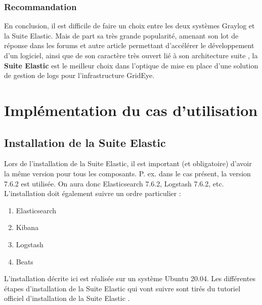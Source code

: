 \documentclass[paper=a4, fontsize=11pt]{scrartcl}
\begin{document}
\subsubsection{Recommandation}
En conclusion, il est difficile de faire un choix entre les deux systèmes Graylog et la Suite Elastic. Mais de part sa très grande popularité, amenant son lot de réponse dans les forums et autre article permettant d'accélérer le développement d'un logiciel, ainsi que de son caractère très ouvert lié à son \og architecture suite \fg, la \textbf{Suite Elastic} est le meilleur choix dans l'optique de mise en place d'une solution de gestion de logs pour l'infrastructure GridEye.

\newpage

\section{Implémentation du cas d'utilisation}

\subsection{Installation de la Suite Elastic} \label{installationElasticStack}

Lors de l'installation de la Suite Elastic, il est important (et obligatoire) d'avoir la même version pour tous les composants. P. ex. dans le cas présent, la version 7.6.2 est utilisée. On aura donc Elasticsearch 7.6.2, Logstash 7.6.2, etc.
L'installation doit également suivre un ordre particulier :
\begin{enumerate}
    \item Elasticsearch
    \item Kibana
    \item Logstash
    \item Beats
\end{enumerate}
L'installation décrite ici est réalisée sur un système Ubuntu 20.04.
Les différentes étapes d'installation de la Suite Elastic qui vont suivre sont tirés du tutoriel officiel d'installation de la Suite Elastic \cite{noauthor_installing_nodate}.
\end{document}
